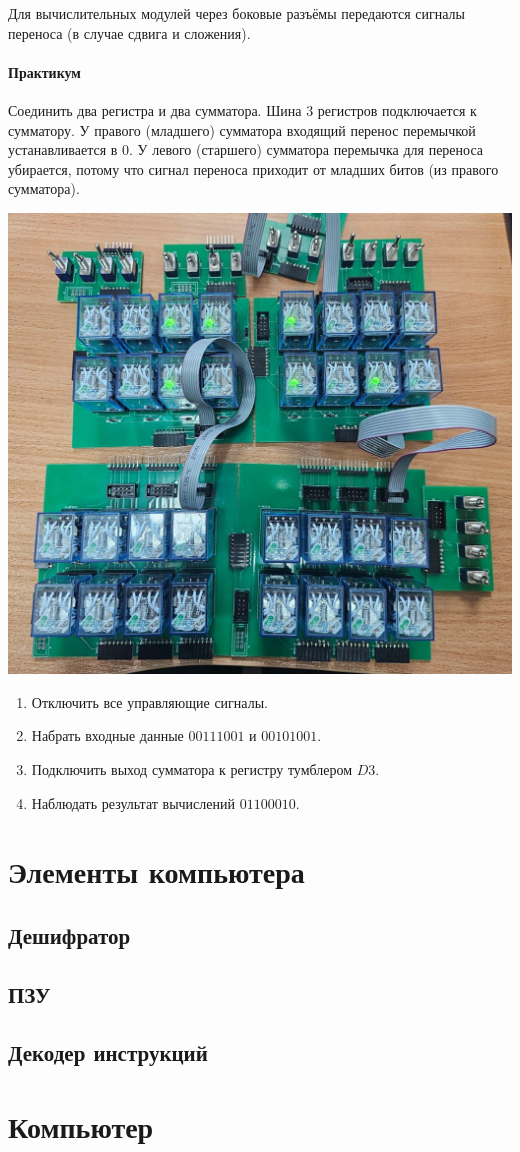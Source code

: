 \documentclass{book}
\begin{document}
Для вычислительных модулей через боковые разъёмы передаются сигналы переноса (в случае сдвига и сложения).

\subsubsection{Практикум}

Соединить два регистра и два сумматора. Шина $3$ регистров подключается к сумматору.
У правого (младшего) сумматора входящий перенос перемычкой устанавливается в $0$.
У левого (старшего) сумматора перемычка для переноса убирается, потому что
сигнал переноса приходит от младших битов (из правого сумматора).

\includegraphics[width=0.5\columnwidth]{photo/8bit.jpg}

\begin{enumerate}
    \item Отключить все управляющие сигналы.
    \item Набрать входные данные $0011 1001$ и $0010 1001$.
    \item Подключить выход сумматора к регистру тумблером $D3$.
    \item Наблюдать результат вычислений $0110 0010$.
\end{enumerate}

\chapter{Элементы компьютера}

\section{Дешифратор}

\section{ПЗУ}

\section{Декодер инструкций}

\chapter{Компьютер}
\end{document}
